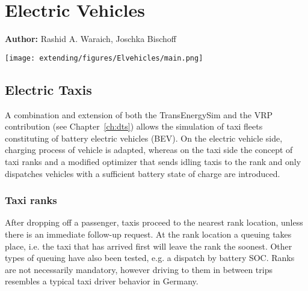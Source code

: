 \chapter{Electric Vehicles }
\label{ch:elvehicles}

\hfill \textbf{Author:} Rashid A. Waraich, Joschka Bischoff

\begin{center} \texttt{[image: extending/figures/Elvehicles/main.png]} \end{center}


\section{Electric Taxis} 
A combination and extension of both the TransEnergySim and the VRP contribution (see Chapter~\ref{ch:dts}) allows the simulation of taxi fleets constituting of battery electric vehicles (BEV).
On the electric vehicle side, charging process of vehicle is adapted, whereas on the taxi side the concept of taxi ranks and a modified optimizer that sends idling taxis to the rank and only dispatches vehicles with a sufficient battery state of charge are introduced. 
\subsection{Taxi ranks}
After dropping off a passenger, taxis proceed to the nearest rank location, unless there is an immediate follow-up request. At the rank location a queuing takes place, i.e. the taxi that has arrived first will leave the rank the soonest. Other types of queuing have also been tested, e.g. a dispatch by battery SOC.
Ranks are not necessarily mandatory, however driving to them in between trips resembles a typical taxi driver behavior in Germany.
